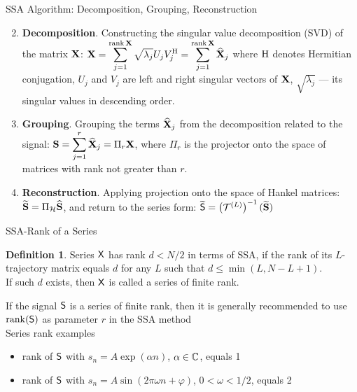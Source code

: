 \documentclass[pdf, unicode, ucs, notheorems]{beamer}
\theoremstyle{definition}
\newtheorem{definition}{Definition}
\begin{document}
\begin{frame}{SSA Algorithm: Decomposition, Grouping, Reconstruction}
  \begin{enumerate}
      \setcounter{enumi}{1}
    \item \textbf{Decomposition}.
      Constructing the singular value decomposition (SVD) of the matrix $\mathbf{X}$:
      $\displaystyle \mathbf{X} = \sum_{j=1}^{\operatorname{rank}\mathbf{X}}
      \sqrt{\lambda_j} U_j V_j^{\mathrm{H}} =
      \sum_{j=1}^{\operatorname{rank}\mathbf{X}} \widehat{\mathbf{X}}_j$
      where $\mathrm{H}$ denotes Hermitian
      conjugation, $U_j$ and $V_j$ are left and right singular vectors
      of $\mathbf{X}$, $\sqrt{\lambda_j}$ --- its singular values in
      descending order.
      \vspace{0.2cm}\\
    \item \textbf{Grouping}. Grouping the terms $\widehat{\mathbf{X}}_j$
      from the decomposition related to the signal:
      $\displaystyle \mathbf{S} = \sum_{j=1}^{r}\widehat{\mathbf{X}}_j = \Pi_r \mathbf{X}$,
      where $\Pi_r$ is the projector onto the space of matrices with
      rank not greater than $r$.
      \vspace{0.2cm}
    \item \textbf{Reconstruction}. Applying projection onto the
      space of Hankel
      matrices: $\widetilde{\mathbf{S}}= \Pi_{\mathcal{H}}\widehat{\mathbf{S}}$,
      and return to the series form: $\widetilde{\mathsf{S}}=
      \left(\mathcal{T}^{(L)}\right)^{-1}(\widetilde{\mathbf{S}})$
  \end{enumerate}
\end{frame}

\begin{frame}{SSA-Rank of a Series}
  \begin{definition}
    Series $\mathsf{X}$ has rank $d < N/2$ in terms of SSA, if the rank of
    its $L$-trajectory matrix equals $d$ for any $L$ such that $d
    \leqslant \min(L,
    N - L + 1)$.\\
    If such $d$ exists, then $\mathsf{X}$ is called a series of finite rank.
  \end{definition}
  \vspace{0.5cm}
  If the signal $\mathsf{S}$ is a series of finite rank, then it is
  generally recommended to use $\operatorname{rank}(\mathsf{S})$ as
  parameter $r$ in the SSA method
  \vspace{0.4cm}\\
  Series rank examples
  \begin{itemize}
    \item rank of $\mathsf{S}$ with $s_n = A \exp(\alpha n)$, $\alpha
      \in\mathbb{C}$, equals 1
    \item rank of $\mathsf{S}$ with $s_n = A\sin(2\pi \omega n + \varphi)$,
      $0 < \omega < 1/2$, equals 2
  \end{itemize}
\end{frame}
\end{document}
